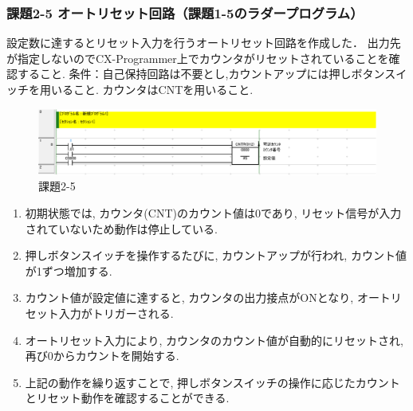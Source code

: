 \subsubsection*{課題2-5 オートリセット回路（課題1-5のラダープログラム）}
設定数に達するとリセット入力を行うオートリセット回路を作成した．
出力先が指定しないのでCX-Programmer上でカウンタがリセットされていることを確認すること.
条件：自己保持回路は不要とし,カウントアップには押しボタンスイッチを用いること.
カウンタはCNTを用いること.
\begin{figure}[H]
  \centering
  \includegraphics[scale=1]{sozai/2-5-crop.pdf}
  \caption{課題2-5}
\end{figure}
\begin{enumerate}
  \item 初期状態では, カウンタ(CNT)のカウント値は0であり, リセット信号が入力されていないため動作は停止している.
  \item 押しボタンスイッチを操作するたびに, カウントアップが行われ, カウント値が1ずつ増加する.
  \item カウント値が設定値に達すると, カウンタの出力接点がONとなり, オートリセット入力がトリガーされる.
  \item オートリセット入力により, カウンタのカウント値が自動的にリセットされ, 再び0からカウントを開始する.
  \item 上記の動作を繰り返すことで, 押しボタンスイッチの操作に応じたカウントとリセット動作を確認することができる.
\end{enumerate}


